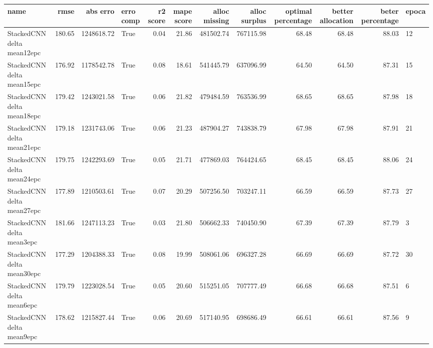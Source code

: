 \begin{tabular}{lrrlrrrrrrrl}
\toprule
name & rmse & abs erro & erro comp & r2 score & mape score & alloc missing & alloc surplus & optimal percentage & better allocation & beter percentage & epoca \\
\midrule
StackedCNN delta mean12epc & 180.65 & 1248618.72 & True & 0.04 & 21.86 & 481502.74 & 767115.98 & 68.48 & 68.48 & 88.03 & 12 \\
StackedCNN delta mean15epc & 176.92 & 1178542.78 & True & 0.08 & 18.61 & 541445.79 & 637096.99 & 64.50 & 64.50 & 87.31 & 15 \\
StackedCNN delta mean18epc & 179.42 & 1243021.58 & True & 0.06 & 21.82 & 479484.59 & 763536.99 & 68.65 & 68.65 & 87.98 & 18 \\
StackedCNN delta mean21epc & 179.18 & 1231743.06 & True & 0.06 & 21.23 & 487904.27 & 743838.79 & 67.98 & 67.98 & 87.91 & 21 \\
StackedCNN delta mean24epc & 179.75 & 1242293.69 & True & 0.05 & 21.71 & 477869.03 & 764424.65 & 68.45 & 68.45 & 88.06 & 24 \\
StackedCNN delta mean27epc & 177.89 & 1210503.61 & True & 0.07 & 20.29 & 507256.50 & 703247.11 & 66.59 & 66.59 & 87.73 & 27 \\
StackedCNN delta mean3epc & 181.66 & 1247113.23 & True & 0.03 & 21.80 & 506662.33 & 740450.90 & 67.39 & 67.39 & 87.79 & 3 \\
StackedCNN delta mean30epc & 177.29 & 1204388.33 & True & 0.08 & 19.99 & 508061.06 & 696327.28 & 66.69 & 66.69 & 87.72 & 30 \\
StackedCNN delta mean6epc & 179.79 & 1223028.54 & True & 0.05 & 20.60 & 515251.05 & 707777.49 & 66.68 & 66.68 & 87.51 & 6 \\
StackedCNN delta mean9epc & 178.62 & 1215827.44 & True & 0.06 & 20.69 & 517140.95 & 698686.49 & 66.61 & 66.61 & 87.56 & 9 \\
\bottomrule
\end{tabular}
